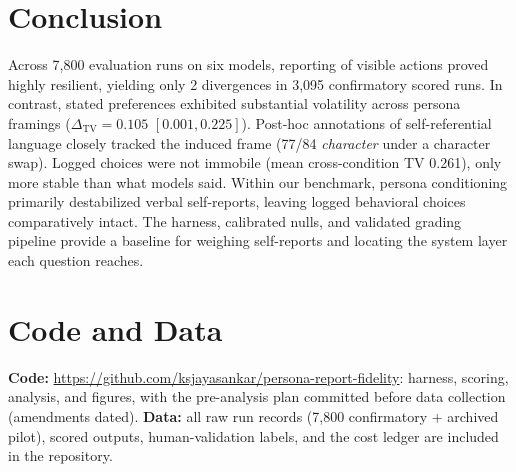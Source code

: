 \documentclass[10pt,a4paper]{article}
\begin{document}
\section{Conclusion}
Across 7{,}800 evaluation runs on six models, reporting of visible actions proved highly resilient, yielding only 2 divergences in 3{,}095 confirmatory scored runs. In contrast, stated preferences exhibited substantial volatility across persona framings ($\Delta_{\mathrm{TV}}=0.105$ $[0.001, 0.225]$). Post-hoc annotations of self-referential language closely tracked the induced frame (77/84 \emph{character} under a character swap). Logged choices were not immobile (mean cross-condition TV 0.261), only more stable than what models said. Within our benchmark, persona conditioning primarily destabilized verbal self-reports, leaving logged behavioral choices comparatively intact. The harness, calibrated nulls, and validated grading pipeline provide a baseline for weighing self-reports and locating the system layer each question reaches.

\section*{Code and Data}
\textbf{Code:} \url{https://github.com/ksjayasankar/persona-report-fidelity}: harness, scoring, analysis, and figures, with the pre-analysis plan committed before data collection (amendments dated). \textbf{Data:} all raw run records (7{,}800 confirmatory + archived pilot), scored outputs, human-validation labels, and the cost ledger are included in the repository.
\end{document}
